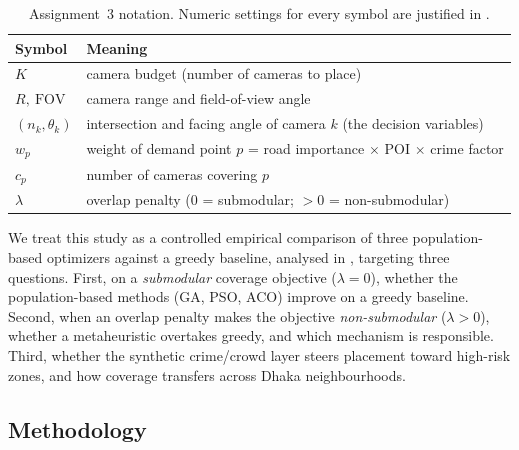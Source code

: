 \documentclass{ai-lab-report}
\begin{document}
\begin{table}[H]
\centering
\small
\begin{tabularx}{\linewidth}{@{}lX@{}}
\toprule
Symbol & Meaning \\
\midrule
$K$ & camera budget (number of cameras to place) \\
$R,\ \text{FOV}$ & camera range and field-of-view angle \\
$(n_k,\theta_k)$ & intersection and facing angle of camera $k$ (the decision variables) \\
$w_p$ & weight of demand point $p$ = road importance $\times$ POI $\times$ crime factor \\
$c_p$ & number of cameras covering $p$ \\
$\lambda$ & overlap penalty ($0$ = submodular; $>0$ = non-submodular) \\
\bottomrule
\end{tabularx}
\caption{Assignment~3 notation. Numeric settings for every symbol are justified in .}
\label{tab:a3notation}
\end{table}

We treat this study as a controlled empirical comparison of three population-based optimizers against a greedy baseline, analysed in , targeting three questions. First, on a \emph{submodular} coverage objective ($\lambda{=}0$), whether the population-based methods (GA, PSO, ACO) improve on a greedy baseline. Second, when an overlap penalty makes the objective \emph{non-submodular} ($\lambda{>}0$), whether a metaheuristic overtakes greedy, and which mechanism is responsible. Third, whether the synthetic crime/crowd layer steers placement toward high-risk zones, and how coverage transfers across Dhaka neighbourhoods.

\subsection{Methodology}
\end{document}
